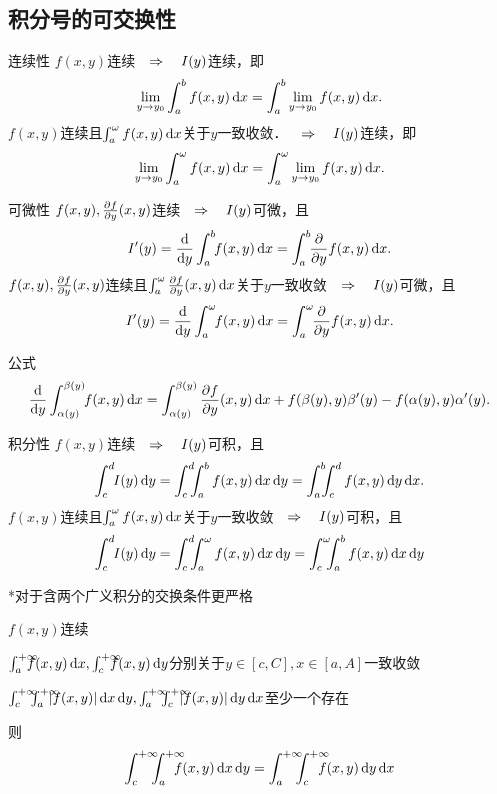 \subsection{积分号的可交换性}
\begin{theorem}{连续性}{}
	$f(x,y)$连续$\quad\Rightarrow\quad I(y)$连续，即
	\[
		\lim_{y\to y_0}\int_a^bf(x,y)\mathop{}\!\mathrm{d} x=\int_a^b\lim_{y\to y_0}f(x,y)\mathop{}\!\mathrm{d} x.
	\]
	\tcblower
	$f(x,y)$连续且$\int_a^\omega f(x,y)\mathop{}\!\mathrm{d} x$关于$y$一致收敛．$\quad\Rightarrow\quad I(y)$连续，即
	\[
		\lim_{y\to y_0}\int_a^\omega f(x,y)\mathop{}\!\mathrm{d} x=\int_a^\omega\lim_{y\to y_0}f(x,y)\mathop{}\!\mathrm{d} x.
	\]
\end{theorem}
\begin{theorem}{可微性}{}
	$f(x,y),\frac{\partial^{\;\!\!}f}{\partial y^{\;\!\!}}(x,y)$连续$\quad\Rightarrow\quad I(y)$可微，且
	\[
		I'(y)=\frac{\d}{\d y}\int_a^b\bs3f(x,y)\d x=\int_a^b\bs3\pp yf(x,y)\d x.
	\]
	\tcblower
	$f(x,y),\frac{\partial^{\;\!\!}f}{\partial y^{\;\!\!}}(x,y)$连续且$\int_a^\omega\frac{\partial^{\;\!\!}f}{\partial y^{\;\!\!}}(x,y)\mathop{}\!\mathrm{d} x$关于$y$一致收敛$\quad\Rightarrow\quad I(y)$可微，且
	\[
		I'(y)=\frac{\d}{\d y}\int_a^\omega\bs3f(x,y)\d x=\int_a^\omega\bs3\pp yf(x,y)\d x.
	\]
\end{theorem}
公式
\[
	\dv{}y\int_{\alpha(y)}^{\beta(y)}\bs3f(x,y)\d x=\int_{\alpha(y)}^{\beta(y)}\pv fy(x,y)\d x+f(\beta(y),y)\beta'(y)-f(\alpha(y),y)\alpha'(y).
\]
\begin{theorem}{积分性}{}
	$f(x,y)$连续$\quad\Rightarrow\quad I(y)$可积，且
	\[
		\int_c^d\bs3I(y)\d y=\int_c^d\bs5\int_a^b f(x,y)\d x\d y=\int_a^b\bs5\int_c^d f(x,y)\d y\d x.
	\]
	\tcblower
	$f(x,y)$连续且$\int_a^\omega f(x,y)\mathop{}\!\mathrm{d} x$关于$y$一致收敛$\quad\Rightarrow\quad I(y)$可积，且
	\[
		\int_c^d\bs3I(y)\d y=\int_c^d\bs5\int_a^\omega f(x,y)\d x\d y=\int_c^\omega\bs5\int_a^b f(x,y)\d x\d y
	\]
\end{theorem}
*对于含两个广义积分的交换条件更严格
\begin{compactenum}
	\item $f(x,y)$连续
	\item $\int_a^{+\infty}\bs{10}f(x,y)\d x,\int_c^{+\infty}\bs{10}f(x,y)\d y$分别关于$y\in[c,C],x\in[a,A]$一致收敛
	\item $\int_c^{+\infty}\bs7\int_a^{+\infty}\bs{10}|f(x,y)|\d x\d y,\int_a^{+\infty}\bs7\int_c^{+\infty}\bs{10}|f(x,y)|\d y\d x$至少一个存在
\end{compactenum}
则
\[
	\int_c^{+\infty}\bs7\int_a^{+\infty}\bs{10}f(x,y)\d x\d y=\int_a^{+\infty}\bs7\int_c^{+\infty}\bs{10}f(x,y)\d y\d x
\]
\clearpage
